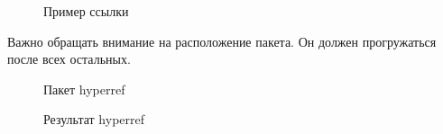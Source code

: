 \documentclass[
  english,
  russian,
  12pt,
  a4paper,
  DIV=11,
  numbers=noendperiod]{scrreprt}
\begin{document}
\begin{figure}


\caption{\label{fig-014}Пример ссылки}

\end{figure}%

Важно обращать внимание на расположение пакета. Он должен прогружаться
после всех остальных.

\begin{figure}


\caption{\label{fig-015}Пакет hyperref}

\end{figure}%

\begin{figure}


\caption{\label{fig-016}Результат hyperref}

\end{figure}%
\end{document}
